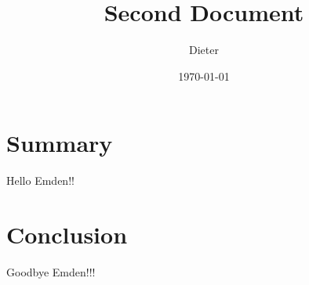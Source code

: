 \documentclass{article}
\title{Second Document}
\author{Dieter}
\date{\today}
\begin{document}
\maketitle

\section{Summary}

Hello Emden!!

\section{Conclusion}

Goodbye Emden!!!
\end{document}
